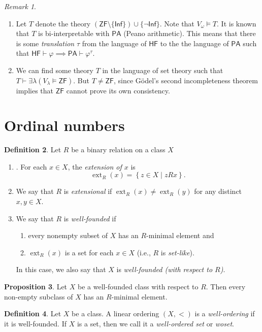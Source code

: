 \documentclass[10pt,letterpaper,cm]{nupset}
\theoremstyle{definition}
\newtheorem{definition}{Definition}[subsection]
\theoremstyle{theorem}
\newtheorem{prop}[definition]{Proposition}
\theoremstyle{remark}
\newtheorem{remark}[definition]{Remark}
\newcommand{\1}{\mathbf{1}}
\newcommand{\0}{\vec 0}
\newcommand{\zf}{\mathsf{ZF}}
\DeclareMathOperator{\ext}{ext}
\newcommand{\be}{\begin{enumerate}}
\newcommand{\ee}{\end{enumerate}}
\begin{document}
\begin{remark} $ $
\begin{enumerate}
\item Let $T$ denote the theory $\left(\zf \setminus \{\mathsf{Inf}\}\right)\cup \{\neg{\mathsf{Inf}}\}$. Note that $V_{\omega} \models T$. It is known that $T$ is bi-interpretable with $\mathsf{PA}$ (Peano arithmetic).  This means that there is some \textit{translation} $\tau$ from the language of $\mathsf{HF}$ to the the language of $\mathsf{PA}$ such that $\mathsf{HF} \vdash \varphi \implies \mathsf{PA} \vdash \varphi^{\tau}$.
\item We can find some theory $T$ in the language of set theory such that $T \vdash \exists \lambda(V_{\lambda}\models \zf)$. But $T \ne \zf$, since G\"odel's second incompleteness theorem implies that $\zf$ cannot prove its own consistency. 
\end{enumerate}
\end{remark}

\section{Ordinal numbers}

\begin{definition}  Let $R$ be a binary relation on a class $X$
\be
\item. For each $x\in X$, the \textit{extension of $x$} is $$\ext_R(x) = \left\{z\in X \mid zRx\right\}    .$$
\item We say that $R$ is \textit{extensional} if $\ext_R(x) \ne \ext_R(y)$ for any distinct $x,y \in X$.
\item We say that $R$ is \textit{well-founded} if 
 \be
 \item every nonempty subset of $X$ has an $R$-minimal element and
 \item $\ext_R(x)$ is a set for each $x\in X$ (i.e., $R$ is \textit{set-like}).
 \ee
 In this case, we also say that $X$ is \textit{well-founded (with respect to $R$)}. 
\ee
 \end{definition}

\begin{prop}
Let $X$ be a well-founded class with respect to $R$. Then every non-empty subclass of $X$ has an $R$-minimal element.
\end{prop}

\begin{definition}
Let $X$ be a class. A linear ordering $\left(X, <\right)$ is a \textit{well-ordering} if it is well-founded. If $X$ is a set, then we call it a \textit{well-ordered set} or \textit{woset}.
\end{definition}
\end{document}

